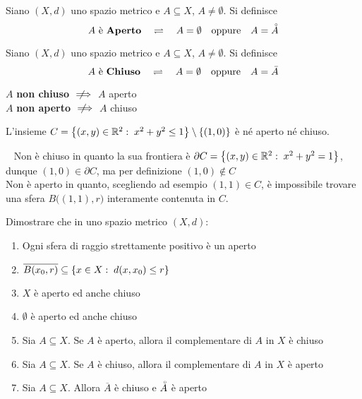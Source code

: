 \begin{definition}
	\label{def:aperto}
	Siano $(X,d)$ uno spazio metrico e $A\subseteq X$, $A \neq \emptyset$. Si definisce
	\[A\text{ è \textbf{Aperto}} \quad \rightleftharpoons \quad A=\emptyset\quad\text{oppure}\quad A=\accentset{\circ}{A}\]
\end{definition}
\begin{definition}
	\label{def:chiuso}
	Siano $(X,d)$ uno spazio metrico e $A\subseteq X$, $A \neq \emptyset$. Si definisce
	\[A\text{ è \textbf{Chiuso}} \quad \rightleftharpoons \quad A=\emptyset\quad\text{oppure}\quad A=\bar{A}\]
\end{definition}
\begin{observation}
	$A$ \textbf{non chiuso} $\notimplies$ $A$ aperto\\
	$A$ \textbf{non aperto} $\notimplies$ $A$ chiuso
\end{observation}
\begin{example}
	\label{ex:ins_non_ap_non_chius}
	L'insieme $C = \left\{(x,y) \in \mathbb{R}^2:\; x^2+y^2 \leq 1\right\} \setminus \left\{(1,0)\right\}$ è né aperto né chiuso.
	\begin{solution}~\newline
		Non è chiuso in quanto la sua frontiera è $\partial C = \left\{(x,y) \in \mathbb{R}^2:\; x^2+y^2 = 1\right\}$, dunque $(1,0) \in \partial C$, ma per definizione $(1,0) \notin C$\\
		Non è aperto in quanto, scegliendo ad esempio $(1,1) \in C$, è impossibile trovare una sfera $B\bigl( (1,1), r \bigr)$ interamente contenuta in $C$.
	\end{solution}
\end{example}
\begin{exercise}
	\label{ex:ins_aperti_chiusi}
	Dimostrare che in uno spazio metrico $(X,d)$:
	\begin{enumerate}
		\item Ogni sfera di raggio strettamente positivo è un aperto
		\item \label{itm:chiusura_sfera} $\overline{B(x_0,r)} \subseteq \left\{x \in X:\; d(x,x_0) \leq r\right\}$
		\item $X$ è aperto ed anche chiuso
		\item $\emptyset$ è aperto ed anche chiuso
		\item Sia $A \subseteq X$. Se $A$ è aperto, allora il complementare di $A$ in $X$ è chiuso
		\item Sia $A \subseteq X$. Se $A$ è chiuso, allora il complementare di $A$ in $X$ è aperto
		\item Sia $A \subseteq X$. Allora $\overline{A}$ è chiuso e $\accentset{\circ}{A}$ è aperto
	\end{enumerate}
\end{exercise}

